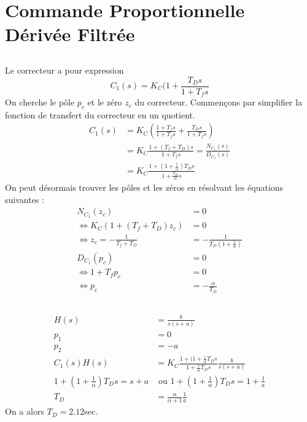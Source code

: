 \documentclass{article}
\begin{document}
\section{Commande Proportionnelle Dérivée Filtrée}
\subsection{}
Le correcteur a pour expression
\begin{equation*}
    C_1(s)=K_C(1+\frac{T_Ds}{1+T_fs}
\end{equation*}
On cherche le pôle $p_c$ et le zéro $z_c$ du correcteur. Commençons par simplifier la fonction de transfert du correcteur en un quotient.
\begin{align*}
    C_1(s)&=K_C(\frac{1+T_fs}{1+T_fs}+\frac{T_Ds}{1+T_fs})\\
    &=K_C\frac{1+(T_f+T_D)s}{1+T_fs}=\frac{N_{C_1}(s)}{D_{C_1}(s)}\\
    &=K_C\frac{1+(1+\frac{1}{\alpha})T_Ds}{1+\frac{T_D}{\alpha}s}
\end{align*}
On peut désormais trouver les pôles et les zéros en résolvant les équations suivantes :
\begin{align*}
    N_{C_1}(z_c)&=0\\
    \Leftrightarrow K_C(1+(T_f+T_D)z_c)&=0\\
    \Leftrightarrow z_c=-\frac{1}{T_f+T_D}&=-\frac{1}{T_D(1+\frac{1}{\alpha})}\\
    D_{C_1}(p_c)&=0\\
    \Leftrightarrow 1+T_fp_c&=0\\
    \Leftrightarrow p_c&=-\frac{\alpha}{T_D}
\end{align*}
\subsection{}
\begin{align*}
    H(s)&=\frac{b}{s(s+a)}\\
    p_1&=0\\
    p_2&=-a\\
    C_1(s)H(s)&=K_C\frac{1+(1+\frac{1}{\alpha}T_Ds}{1+\frac{1}{\alpha}T_Ds}\frac{b}{s(s+a)}\\
    1+(1+\frac{1}{\alpha})T_Ds=s+a&\text{ ou }1+(1+\frac{1}{\alpha})T_Ds=1+\frac{1}{a}\\
    T_D&=\frac{\alpha}{\alpha+1}\frac{1}{a}
\end{align*}
On a alors $T_D=2.12$sec.
\end{document}
